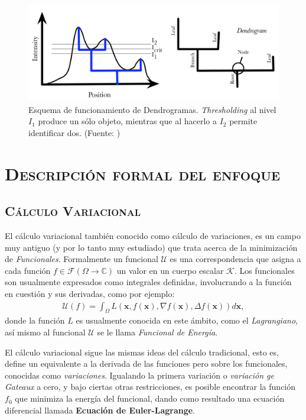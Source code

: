 \documentclass[letter, 11pt]{article}
\begin{document}
\begin{figure}[htpb!]
\centering
\includegraphics[width=12cm]{dendro}
\caption{Esquema de funcionamiento de Dendrogramas. \textit{Thresholding} al nivel $I_1$ produce un sólo objeto, mientras que al hacerlo a $I_2$ permite identificar dos. (Fuente: \cite{Rosolowsky})}
\label{fig:dendro}
\end{figure}



\section{\textsc{Descripción formal del enfoque}}

\subsection{\textsc{Cálculo Variacional}}

El cálculo variacional también conocido como cálculo de variaciones, es un campo muy antiguo (y por lo tanto muy estudiado) que trata acerca de la minimización de \textit{Funcionales}. Formalmente un funcional $\mathcal{U}$ es una correspondencia que asigna a cada función $f \in \mathcal{F}(\Omega \rightarrow \mathbb{C})$ un valor en un cuerpo escalar $\mathcal{K}$. Los funcionales son usualmente expresados como integrales definidas, involucrando a la función en cuestión y sus derivadas, como por ejemplo:
\begin{align}
    \mathcal{U}(f) = \int_{\Omega} L\left(\mathbf{x}, f(\mathbf{x}), \nabla f(\mathbf{x}), \Delta f(\mathbf{x})\right) d \mathbf{x},
\end{align}
donde la función $L$ es usualmente conocida en este ámbito, como el \textit{Lagrangiano}, así mismo al funcional $\mathcal{U}$ se le llama \textit{Funcional de Energía}.

El cálculo variacional sigue las mismas ideas del cálculo tradicional, esto es, define un equivalente a la derivada de las funciones pero sobre los funcionales, conocidas como \textit{variaciones}. Igualando la primera variación o \textit{variación ge Gateaux} a cero, y bajo ciertas otras restricciones, es posible encontrar la función $f_0$ que minimiza la energía del funcional, dando como resultado una ecuación diferencial llamada \textbf{Ecuación de Euler-Lagrange}.
\end{document}
